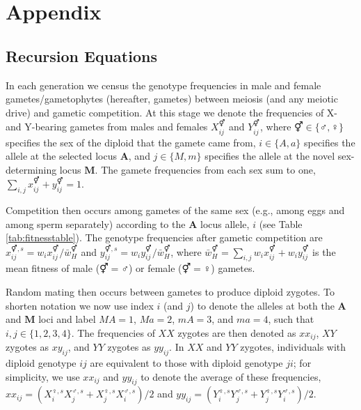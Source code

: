 \documentclass[12pt]{article}
\begin{document}
\setcounter{equation}{0}
\renewcommand{\theequation}{S.\arabic{equation}}
\setcounter{figure}{0}
\renewcommand{\thefigure}{S.\arabic{figure}}
\setcounter{table}{0}
\renewcommand{\thetable}{S.\arabic{table}}

\newpage

\section*{Appendix}

\subsection*{Recursion Equations}
\label{app:recurs}

In each generation we census the genotype frequencies in male and female gametes/gametophytes (hereafter, gametes) between meiosis (and any meiotic drive) and gametic competition. 
At this stage we denote the frequencies of X- and Y-bearing gametes from males and females $X_{ij}^{\Hermaphrodite}$ and $Y_{ij}^{\Hermaphrodite}$, where $\Hermaphrodite \in \{\male,\female\}$ specifies the sex of the diploid that the gamete came from, $i\in\{A,a\}$ specifies the allele at the selected locus $\mathbf{A}$, and $j\in\{M,m\}$ specifies the allele at the novel sex-determining locus $\mathbf{M}$. 
The gamete frequencies from each sex sum to one, $\sum_{i,j}x_{ij}^{\Hermaphrodite}+y_{ij}^{\Hermaphrodite}=1$. 

Competition then occurs among gametes of the same sex (e.g., among eggs and among sperm separately) according to the \textbf{A} locus allele, $i$ (see Table \ref{tab:fitnesstable}).
The genotype frequencies after gametic competition are $x_{ij}^{\Hermaphrodite,s}= w_{i}x_{ij}^{\Hermaphrodite}/\bar{w}_{H}^{\Hermaphrodite}$ and $y_{ij}^{\Hermaphrodite,s}= w_{i}y_{ij}^{\Hermaphrodite}/\bar{w}_{H}^{\Hermaphrodite}$, where $\bar{w}_{H}^{\Hermaphrodite}=\sum_{i,j} w_{i}x_{ij}^{\Hermaphrodite}+w_{i}y_{ij}^{\Hermaphrodite}$ is the mean fitness of male ($\Hermaphrodite=\male$) or female ($\Hermaphrodite=\female$) gametes. 

Random mating then occurs between gametes to produce diploid zygotes.
To shorten notation we now use index $i$ (and $j$) to denote the alleles at both the $\mathbf{A}$ and $\mathbf{M}$ loci and label $MA=1$, $Ma=2$, $mA=3$, and $ma=4$, such that $i,j\in\{1,2,3,4\}$.
The frequencies of $XX$ zygotes are then denoted as $xx_{ij}$, $XY$ zygotes as $xy_{ij}$, and $YY$ zygotes as $yy_{ij}$. 
In $XX$ and $YY$ zygotes, individuals with diploid genotype $ij$ are equivalent to those with diploid genotype $ji$; for simplicity, we use $xx_{ij}$ and $yy_{ij}$ to denote the average of these frequencies, $xx_{ij}=(X_{i}^{\female,s}X_{j}^{\male,s}+X_{j}^{\female,s}X_{i}^{\male,s})/2$ and $yy_{ij}=(Y_{i}^{\female,s}Y_{j}^{\male,s}+Y_{j}^{\female,s}Y_{i}^{\male,s})/2$. 
\end{document}
